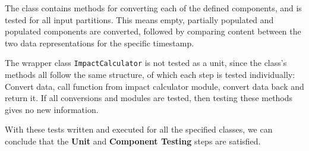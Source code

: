 The class contains methods for converting each of the defined components, and is tested for all input partitions. This means empty, partially populated and populated components are converted, followed by comparing content between the two data representations for the specific timestamp.

The wrapper class \texttt{ImpactCalculator} is not tested as a unit, since the class's methods all follow the same structure, of which each step is tested individually: Convert data, call function from impact calculator module, convert data back and return it. If all conversions and modules are tested, then testing these methods gives no new information. 

\vspace{1cm}
With these tests written and executed for all the specified classes, we can conclude that the \textbf{Unit} and \textbf{Component Testing} steps are satisfied.